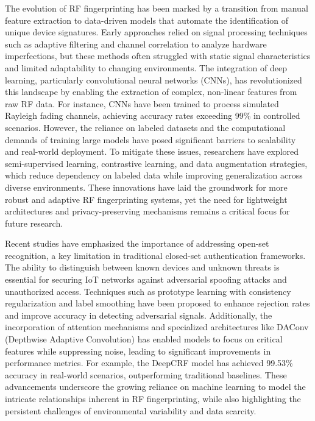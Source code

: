\documentclass[conference]{IEEEtran}
\begin{document}
The evolution of RF fingerprinting has been marked by a transition from manual feature extraction to data-driven models that automate the identification of unique device signatures. Early approaches relied on signal processing techniques such as adaptive filtering and channel correlation to analyze hardware imperfections, but these methods often struggled with static signal characteristics and limited adaptability to changing environments. The integration of deep learning, particularly convolutional neural networks (CNNs), has revolutionized this landscape by enabling the extraction of complex, non-linear features from raw RF data. For instance, CNNs have been trained to process simulated Rayleigh fading channels, achieving accuracy rates exceeding 99\% in controlled scenarios. However, the reliance on labeled datasets and the computational demands of training large models have posed significant barriers to scalability and real-world deployment. To mitigate these issues, researchers have explored semi-supervised learning, contrastive learning, and data augmentation strategies, which reduce dependency on labeled data while improving generalization across diverse environments. These innovations have laid the groundwork for more robust and adaptive RF fingerprinting systems, yet the need for lightweight architectures and privacy-preserving mechanisms remains a critical focus for future research.

Recent studies have emphasized the importance of addressing open-set recognition, a key limitation in traditional closed-set authentication frameworks. The ability to distinguish between known devices and unknown threats is essential for securing IoT networks against adversarial spoofing attacks and unauthorized access. Techniques such as prototype learning with consistency regularization and label smoothing have been proposed to enhance rejection rates and improve accuracy in detecting adversarial signals. Additionally, the incorporation of attention mechanisms and specialized architectures like DAConv (Depthwise Adaptive Convolution) has enabled models to focus on critical features while suppressing noise, leading to significant improvements in performance metrics. For example, the DeepCRF model has achieved 99.53\% accuracy in real-world scenarios, outperforming traditional baselines. These advancements underscore the growing reliance on machine learning to model the intricate relationships inherent in RF fingerprinting, while also highlighting the persistent challenges of environmental variability and data scarcity.
\end{document}
